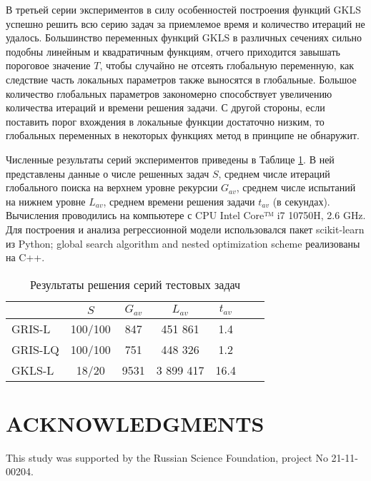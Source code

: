 \documentclass{aip-cp}
\begin{document}
В третьей серии экспериментов в силу особенностей построения функций GKLS успешно решить всю серию задач за приемлемое время и количество итераций не удалось. Большинство переменных функций GKLS в различных сечениях сильно подобны линейным и квадратичным функциям, отчего приходится завышать пороговое значение $T$, чтобы случайно не отсеять глобальную переменную, как следствие часть локальных параметров также выносятся в глобальные. Большое количество глобальных параметров закономерно способствует увеличению количества итераций и времени решения задачи. С другой стороны, если поставить порог вхождения в локальные функции достаточно низким, то глобальных переменных в некоторых функциях метод в принципе не обнаружит.

Численные результаты серий экспериментов приведены в Таблице \ref{tab1}. В ней представлены данные о числе решенных задач $S$, среднем числе итераций глобального поиска на верхнем уровне рекурсии $G_{av}$, среднем числе испытаний на нижнем уровне $L_{av}$, среднем времени решения задачи $t_{av}$ (в секундах).
Вычисления проводились на компьютере с CPU Intel Core™ i7 10750H, 2.6 GHz. Для построения и анализа регрессионной модели использовался пакет scikit-learn из Python; global search algorithm and nested optimization scheme реализованы на C++.


\begin{table}[ht]
	\caption{Результаты решения серий тестовых задач}
	\label{tab1}
		\begin{tabular}{ l c c c c c c } \hline
		 & $S$ &  $G_{av}$ &  $L_{av}$ & $t_{av}$ \\
    \hline
		GRIS-L & 100/100  & 847 &  451 861 & 1.4 \\
		GRIS-LQ & 100/100 & 751 &  448 326 & 1.2 \\
		GKLS-L & 18/20 & 9531 &  3 899 417 & 16.4 \\
		\hline
		\end{tabular}
\end{table}




\section{ACKNOWLEDGMENTS}
This study was supported by the Russian Science Foundation, project No 21-11-00204.




%
%
\end{document}
